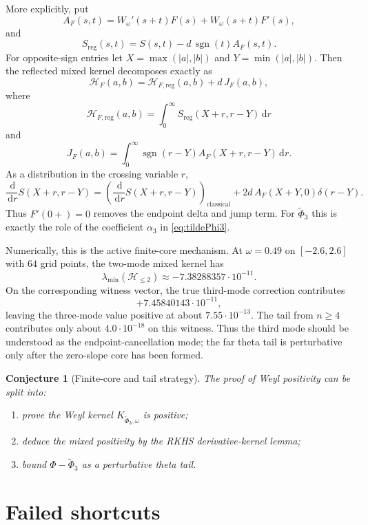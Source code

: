 \documentclass[11pt]{article}
\newtheorem{conjecture}[theorem]{Conjecture}
\newcommand{\dd}{\,\mathrm d}
\begin{document}
More explicitly, put
\[
   A_F(s,t)
   =
   W_\omega'(s+t)F(s)+W_\omega(s+t)F'(s),
\]
and
\[
   S_{\mathrm{reg}}(s,t)
   =
   S(s,t)-d\,\operatorname{sgn}(t)A_F(s,t).
\]
For opposite-sign entries let $X=\max(|a|,|b|)$ and
$Y=\min(|a|,|b|)$.  Then the reflected mixed kernel decomposes exactly as
\begin{equation}
  \mathcal H_F(a,b)
  =
  \mathcal H_{F,\mathrm{reg}}(a,b)
  +
  d\,J_F(a,b),
  \label{eq:endpoint-decomp}
\end{equation}
where
\[
  \mathcal H_{F,\mathrm{reg}}(a,b)
  =
  \int_0^\infty S_{\mathrm{reg}}(X+r,r-Y)\dd r
\]
and
\[
  J_F(a,b)
  =
  \int_0^\infty
     \operatorname{sgn}(r-Y)A_F(X+r,r-Y)\dd r.
\]
As a distribution in the crossing variable $r$,
\[
  \frac{\dd}{\dd r}S(X+r,r-Y)
  =
  \left(\frac{\dd}{\dd r}S(X+r,r-Y)\right)_{\mathrm{classical}}
  +
  2d\,A_F(X+Y,0)\delta(r-Y).
\]
Thus $F'(0+)=0$ removes the endpoint delta and jump term.  For
$\widetilde\Phi_3$ this is exactly the role of the coefficient $\alpha_3$ in
\eqref{eq:tildePhi3}.

Numerically, this is the active finite-core mechanism.  At $\omega=0.49$ on
$[-2.6,2.6]$ with $64$ grid points, the two-mode mixed kernel has
\[
   \lambda_{\min}(\mathcal H_{\le 2})
   \approx -7.38288357\cdot 10^{-11}.
\]
On the corresponding witness vector, the true third-mode correction contributes
\[
  +7.45840143\cdot 10^{-11},
\]
leaving the three-mode value positive at about $7.55\cdot 10^{-13}$.  The
tail from $n\ge 4$ contributes only about $4.0\cdot 10^{-18}$ on this witness.
Thus the third mode should be understood as the endpoint-cancellation mode;
the far theta tail is perturbative only after the zero-slope core has been
formed.

\begin{conjecture}[Finite-core and tail strategy]
The proof of Weyl positivity can be split into:
\begin{enumerate}
  \item prove the Weyl kernel $K_{\widetilde\Phi_3,\omega}$ is positive;
  \item deduce the mixed positivity by the RKHS derivative-kernel lemma;
  \item bound $\Phi-\widetilde\Phi_3$ as a perturbative theta tail.
\end{enumerate}
\end{conjecture}

\section{Failed shortcuts}
\end{document}
